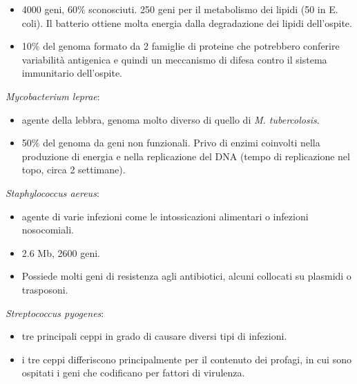 \begin{multicols}{2}
\begin{itemize}
    \item 4000 geni, 60$\%$ sconosciuti. 
	250 geni per il metabolismo dei lipidi (50 in E. coli). 
	Il batterio ottiene molta energia dalla degradazione dei lipidi dell'ospite.
    \item 10$\%$ del genoma formato da 2 famiglie di proteine che potrebbero conferire variabilit\`a antigenica e quindi un meccanismo di difesa contro il sistema immunitario dell'ospite.
\end{itemize}
\textit{Mycobacterium leprae}:
\begin{itemize}
    \item agente della lebbra, genoma molto diverso di quello di \textit{M. tubercolosis}.
    \item 50$\%$ del genoma da geni non funzionali.
Privo di enzimi coinvolti nella produzione di energia e nella replicazione del DNA (tempo di replicazione nel topo, circa 2 settimane).
\end{itemize}
\textit{Staphylococcus aereus}:
\begin{itemize}
    \item agente di varie infezioni come le intossicazioni alimentari o infezioni nosocomiali.
    \item 2.6 Mb, 2600 geni.
    \item Possiede molti geni di resistenza agli antibiotici, alcuni collocati su plasmidi o trasposoni.
\end{itemize}
\textit{Streptococcus pyogenes}:
\begin{itemize}
    \item tre principali ceppi in grado di causare diversi tipi di infezioni.
    \item i tre ceppi differiscono principalmente per il contenuto dei profagi, in cui sono ospitati i geni che codificano per fattori di virulenza.
\end{itemize}
\end{multicols}
